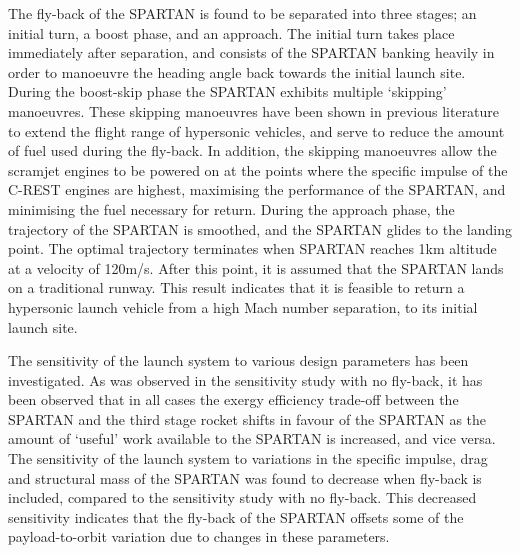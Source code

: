 The fly-back of the SPARTAN is found to be separated into three stages; an initial turn, a boost phase, and an approach. 
The initial turn takes place immediately after separation, and consists of the SPARTAN banking heavily in order to manoeuvre the heading angle back towards the initial launch site. 
During the boost-skip phase the SPARTAN exhibits multiple `skipping' manoeuvres. These skipping manoeuvres have been shown in previous literature to extend the flight range of hypersonic vehicles\cite{Moshman2014,Darby2011,Toso2015,Tetlow1992}, and serve to reduce the amount of fuel used during the fly-back.
In addition, the skipping manoeuvres allow the scramjet engines to be powered on at the points where the specific impulse of the C-REST engines are highest, maximising the performance of the SPARTAN, and minimising the fuel necessary for return. 
During the approach phase, the trajectory of the SPARTAN is smoothed, and the SPARTAN glides to the landing point. 
 The optimal trajectory terminates when SPARTAN reaches 1km altitude at a velocity of 120m/s. After this point, it is assumed that the SPARTAN lands on a traditional runway.  
This result indicates that it is feasible to return a hypersonic launch vehicle from a high Mach number separation, to its initial launch site.  

The sensitivity of the launch system to various design parameters has been investigated. As was observed in the sensitivity study with no fly-back, it has been observed that in all cases the exergy efficiency trade-off between the SPARTAN and the third stage rocket shifts in favour of the SPARTAN as the amount of `useful' work available to the SPARTAN is increased, and vice versa. 
The sensitivity of the launch system to variations in the specific impulse, drag and structural mass of the SPARTAN was found to decrease when fly-back is included, compared to the sensitivity study with no fly-back. This decreased sensitivity indicates that the fly-back of the SPARTAN offsets some of the payload-to-orbit variation due to changes in these parameters. 

